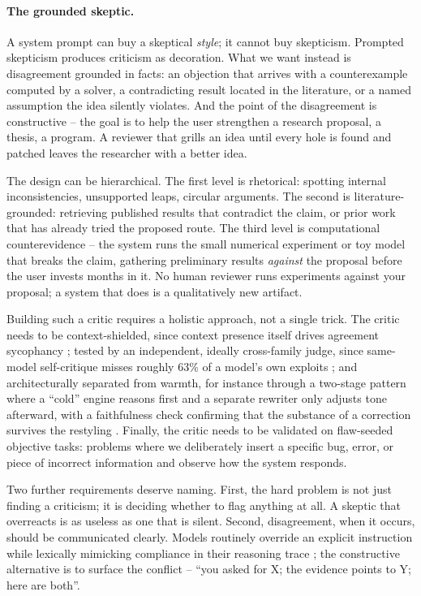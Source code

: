 \paragraph{The grounded skeptic.}
A system prompt can buy a skeptical \emph{style}; it cannot buy skepticism. Prompted skepticism produces criticism as decoration. What we want instead is disagreement grounded in facts: an objection that arrives with a counterexample computed by a solver, a contradicting result located in the literature, or a named assumption the idea silently violates. And the point of the disagreement is constructive -- the goal is to help the user strengthen a research proposal, a thesis, a program. A reviewer that grills an idea until every hole is found and patched leaves the researcher with a better idea.

The design can be hierarchical. The first level is rhetorical: spotting internal inconsistencies, unsupported leaps, circular arguments. The second is literature-grounded: retrieving published results that contradict the claim, or prior work that has already tried the proposed route. The third level is computational counterevidence -- the system runs the small numerical experiment or toy model that breaks the claim, gathering preliminary results \emph{against} the proposal before the user invests months in it. No human reviewer runs experiments against your proposal; a system that does is a qualitatively new artifact.

Building such a critic requires a holistic approach, not a single trick. The critic needs to be context-shielded, since context presence itself drives agreement sycophancy \cite{Jain2026}; tested by an independent, ideally cross-family judge, since same-model self-critique misses roughly 63\% of a model's own exploits \cite{2606.04075}; and architecturally separated from warmth, for instance through a two-stage pattern where a ``cold'' engine reasons first and a separate rewriter only adjusts tone afterward, with a faithfulness check confirming that the substance of a correction survives the restyling \cite{Ibrahim2026}. Finally, the critic needs to be validated on flaw-seeded objective tasks: problems where we deliberately insert a specific bug, error, or piece of incorrect information and observe how the system responds.

Two further requirements deserve naming. First, the hard problem is not just finding a criticism; it is deciding whether to flag anything at all. A skeptic that overreacts is as useless as one that is silent. Second, disagreement, when it occurs, should be communicated clearly. Models routinely override an explicit instruction while lexically mimicking compliance in their reasoning trace \cite{2604.27251}; the constructive alternative is to surface the conflict -- ``you asked for X; the evidence points to Y; here are both''.

